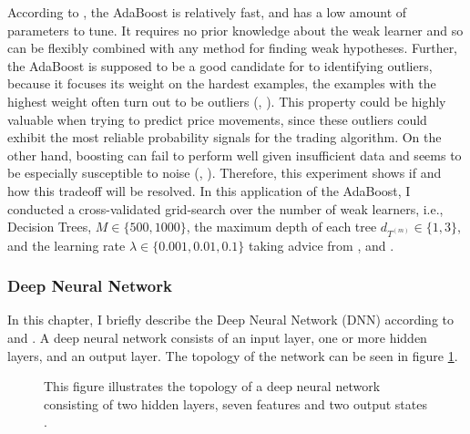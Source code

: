 According to \cite{schapire1999boostingIntro}, the AdaBoost is relatively fast, 
and has a low amount of parameters to tune. It requires no prior knowledge about
the weak learner and so can be flexibly combined with any method for finding weak hypotheses.
Further, the AdaBoost is supposed to be a good candidate for to identifying outliers, because
it focuses its weight on the hardest examples, the examples with the highest weight often
turn out to be outliers (\cite{schapire1996boostingExperiments}, \cite{schapire1999boostingIntro}).
This property could be highly valuable when trying to predict price movements, 
since these outliers could exhibit the most reliable probability signals for the trading algorithm.
On the other hand, boosting can fail to perform well given insufficient data and 
seems to be especially susceptible to noise (\cite{schapire1999boostingIntro}, \cite{dietterich2000ensembleComparison}).
Therefore, this experiment shows if and how this tradeoff will be resolved. 
In this application of the AdaBoost, I conducted a cross-validated grid-search over the number of weak learners, i.e., Decision Trees,
$M \in \{500, 1000\}$,
the maximum depth of each tree $ d_{ T^{ (m) } } \in \{1, 3\} $,
and the learning rate $ \lambda \in \{ 0.001, 0.01, 0.1 \}$
taking advice from \cite{krauss2016arbitrageSandP}, \cite{hastie2009statisticalLearning} and \cite{friedman2002gradientBoosting}.



\subsubsection{Deep Neural Network}
In this chapter, I briefly describe the Deep Neural Network (DNN) according to \cite{dixon2015annMarketPrediction} and \cite{krauss2016arbitrageSandP}. 
A deep neural network consists of an input layer, one or more hidden layers, and an output layer.
The topology of the network can be seen in figure \ref{fig:deep_network_topology}. 

\begin{figure}[H]
    \captionsetup{format=plain}
    \caption{ 
        This figure illustrates the topology of a deep neural network consisting of two hidden layers, seven features and two output states \cite{dixon2015annMarketPrediction}.
        }
    \label{fig:deep_network_topology}
\end{figure}


